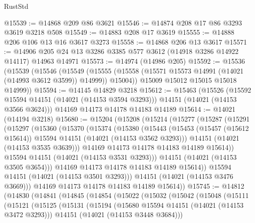 \begin{lexlean}{RustStd}
\begin{coremodule}
@15539 := @14868 @209 @86 @3621
@15546 := @14874 @208 @17 @86 @3293 @3619 @3218 @508
@15549 := @14883 @208 @17 @3619
@15555 := @14888 @206 @106 @13 @16 @3617 @3273
@15558 := @14868 @206 @13 @3617
@15571 := @14906 @205 @24 @13 @3286 @3385 @577 @3612 (@14918 @3286 @14922 @14117) @14963 @14971
@15573 := @14974 (@14986 @205)
@15592 := @15536
    (@15539
      (@15546
        (@15549
          (@15555 (@15558 (@15571 @15573 @14991 (@14021 (@14993 @3612 @3599)) @14999)) @15004))
        @15009
        @15012
        @15015
        @15018
        @14999))
@15594 := @14145 @14829 @3218
@15612 := @15463
    (@15526
      (@15592 @15594 @14151 (@14021 (@14153 @3594 @3293)))
      @14151
      (@14021 (@14153 @3566 @3624)))
    @14169
    @14173
    @14178
    @14183
    @14189
@15614 := @14021 (@14194 @3218)
@15680 := @15204
    (@15208
      (@15214
        (@15277
          (@15287
            (@15291
              (@15297
                (@15360
                  (@15370
                    (@15374
                      (@15380
                        (@15443
                          (@15453
                            (@15457 (@15612 @15614))
                            @15594
                            @14151
                            (@14021 (@14153 @3562 @3293)))
                          @14151
                          (@14021 (@14153 @3535 @3639)))
                        @14169
                        @14173
                        @14178
                        @14183
                        @14189
                        @15614))
                    @15594
                    @14151
                    (@14021 (@14153 @3531 @3293)))
                  @14151
                  (@14021 (@14153 @3505 @3654)))
                @14169
                @14173
                @14178
                @14183
                @14189
                @15614))
            @15594
            @14151
            (@14021 (@14153 @3501 @3293)))
          @14151
          (@14021 (@14153 @3476 @3669)))
        @14169
        @14173
        @14178
        @14183
        @14189
        @15614))
@15745 := @14812
    (@14830
      (@14841
        (@14845
          (@14854
            (@15022
              (@15032
                (@15042
                  (@15048
                    (@15111
                      (@15121
                        (@15125
                          (@15131
                            (@15194
                              (@15680 @15594 @14151 (@14021 (@14153 @3472 @3293)))
                              @14151
                              (@14021 (@14153 @3448 @3684)))

\end{coremodule}
\end{lexlean}
